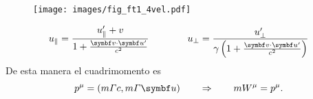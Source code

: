 \documentclass[10pt,oneside]{CBFT_book}
\begin{document}
\begin{figure}[htb]
	\begin{center}
	\texttt{[image: images/fig\_ft1\_4vel.pdf]}	 
	\end{center}
	\caption{}
\end{figure} 

\[
	u_\parallel = \frac{ u'_\parallel + v}{ 1 + \frac{\pe{v}{u'}}{c^2} } \qquad \qquad 
	u_\perp = \frac{ u'_\perp}{\gamma\left(1 + \frac{\pe{v}{u'}}{c^2}\right)}
\]
De esta manera el cuadrimomento es 
\[
	p^\mu = ( m\Gamma c, m \Gamma \vb{u}) \qquad \Rightarrow \qquad m W^\mu = p^\mu.
\]

\end{document}
